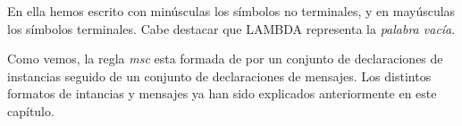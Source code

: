 En ella hemos escrito con minúsculas los símbolos no terminales, y en 
mayúsculas los símbolos terminales. Cabe destacar que LAMBDA
representa la \textit{palabra vacía}.

Como vemos, la regla \textit{msc} esta formada de por un conjunto de
declaraciones de instancias seguido de un conjunto de declaraciones de
mensajes. Los distintos formatos de intancias y mensajes ya han sido
explicados anteriormente en este capítulo.

